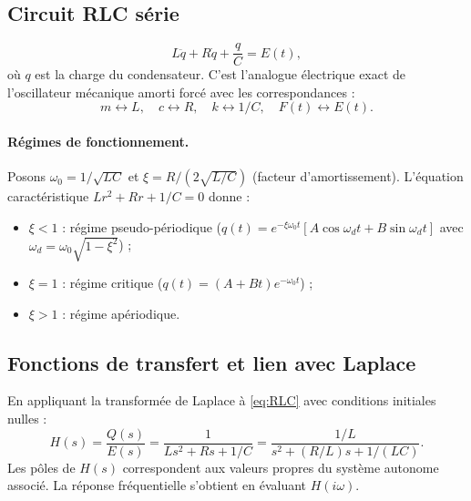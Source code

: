 \documentclass[12pt,a4paper,openany]{book}
\theoremstyle{definition}
\theoremstyle{plain}
\theoremstyle{remark}
\begin{document}
\subsection{Circuit RLC série}
\label{subsec:circuit-RLC}

\begin{equation}
\label{eq:RLC}
L\ddot{q} + R\dot{q} + \frac{q}{C} = E(t),
\end{equation}
où $q$ est la charge du condensateur. C'est l'analogue électrique
exact de l'oscillateur mécanique amorti forcé avec les
correspondances :
\[
m \leftrightarrow L, \quad c \leftrightarrow R, \quad
k \leftrightarrow 1/C, \quad F(t) \leftrightarrow E(t).
\]

\paragraph{Régimes de fonctionnement.}
Posons $\omega_0 = 1/\sqrt{LC}$ et $\xi = R/(2\sqrt{L/C})$
(facteur d'amortissement). L'équation caractéristique
$Lr^2 + Rr + 1/C = 0$ donne :
\begin{itemize}
  \item $\xi < 1$ : régime pseudo-périodique
        ($q(t) = e^{-\xi\omega_0 t}[A\cos\omega_d t + B\sin\omega_d t]$
        avec $\omega_d = \omega_0\sqrt{1-\xi^2}$) ;
  \item $\xi = 1$ : régime critique
        ($q(t) = (A + Bt)e^{-\omega_0 t}$) ;
  \item $\xi > 1$ : régime apériodique.
\end{itemize}

\subsection{Fonctions de transfert et lien avec Laplace}
\label{subsec:transfert}

En appliquant la transformée de Laplace à \eqref{eq:RLC} avec
conditions initiales nulles :
\[
H(s) = \frac{Q(s)}{E(s)} = \frac{1}{Ls^2 + Rs + 1/C}
= \frac{1/L}{s^2 + (R/L)s + 1/(LC)}.
\]
Les pôles de $H(s)$ correspondent aux valeurs propres du système
autonome associé. La réponse fréquentielle s'obtient en évaluant
$H(i\omega)$.
\end{document}
